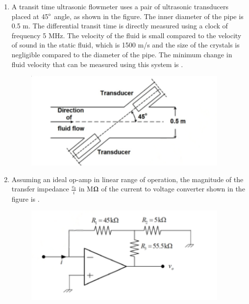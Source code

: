 \documentclass[journal,12pt,onecolumn]{IEEEtran}
\theoremstyle{remark}
\begin{document}
\begin{enumerate}
    \hfill{}

    

    \item A transit time ultrasonic flowmeter uses a pair of ultrasonic transducers placed at 45$\degree$ angle, as shown in the figure. The inner diameter of the pipe is 0.5 m. The differential transit time is directly measured using a clock of frequency 5 MHz. The velocity of the fluid is small compared to the velocity of sound in the static fluid, which is 1500 m/s and the size of the crystals is negligible compared to the diameter of the pipe. The minimum change in fluid velocity  that can be measured using this system is \underline{\hspace{2cm}}.
    \begin{figure}[H]
        \centering
        \includegraphics[width=0.6\columnwidth]{q36}
        \caption*{}
        \label{Q36}
    \end{figure}

    \hfill{}
    
    \item Assuming an ideal op-amp in linear range of operation, the magnitude of the transfer impedance $\frac{v_0}{i}$ in M$\ohm$ of the current to voltage converter shown in the figure is \underline{\hspace{2cm}}.
    \begin{figure}[H]
        \centering
        \includegraphics[width=0.6\columnwidth]{q37}
        \caption*{}
        \label{Q37}
    \end{figure}

    \hfill{}
    

\end{enumerate}
\end{document}
